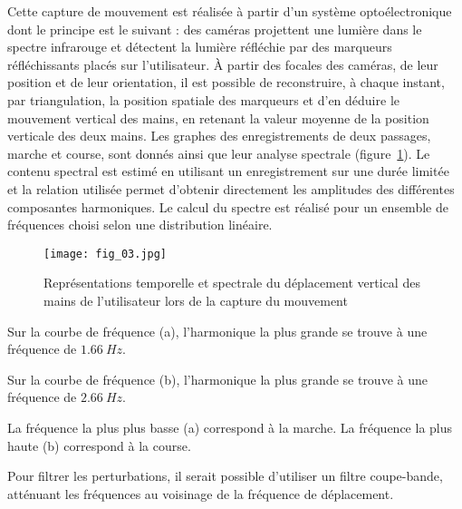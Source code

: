 Cette capture de mouvement est réalisée à partir d'un système optoélectronique dont le principe est le suivant : des caméras projettent une lumière dans le spectre infrarouge et détectent la lumière réfléchie par des marqueurs réfléchissants placés sur l'utilisateur. À partir des focales des caméras, de leur position et de leur orientation, il est possible de reconstruire, à chaque instant, par triangulation, la position spatiale des marqueurs et d'en déduire le mouvement vertical des mains, en retenant la valeur moyenne de la position verticale des deux mains. Les graphes des enregistrements de deux passages, marche et course, sont donnés ainsi que leur analyse spectrale (figure~\ref{fig:03}). Le contenu spectral est estimé en utilisant un enregistrement sur une durée limitée et la relation utilisée permet d'obtenir directement les amplitudes des différentes composantes harmoniques. Le calcul du spectre est réalisé pour un ensemble de fréquences choisi selon une distribution linéaire.


\begin{figure}[H]
\centering
\texttt{[image: fig\_03.jpg]}
\caption{\label{fig:03} Représentations temporelle et spectrale du déplacement vertical des mains de l'utilisateur lors de la capture du mouvement}
\end{figure}
\fi
 
\ifprof
\begin{corrige}
Sur la courbe de fréquence (a), l’harmonique la plus grande se trouve à une fréquence de $\SI{1,66}{Hz}$.

Sur la courbe de fréquence (b), l’harmonique la plus grande se trouve à une fréquence de $\SI{2,66}{Hz}$.

La fréquence la plus plus basse (a) correspond à la marche. La fréquence la plus haute (b) correspond à la course.

\end{corrige}
\else
\fi

\ifprof
\begin{corrige}

Pour filtrer les perturbations, il serait possible d'utiliser un filtre coupe-bande, atténuant les fréquences au voisinage de la fréquence de déplacement.
\end{corrige}
\else
\fi

